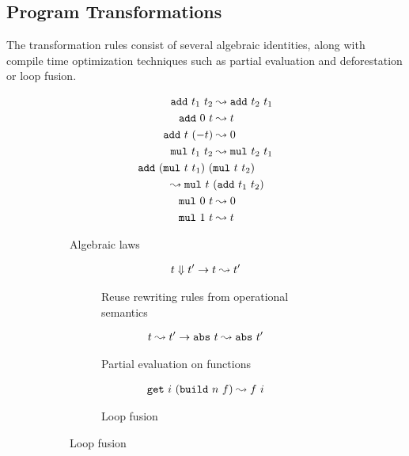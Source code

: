 \subsection{Program Transformations}
The transformation rules consist of several algebraic identities, along with compile time optimization techniques such as partial evaluation and deforestation or loop fusion.

\begin{figure}[]
  \centering
  \begin{subfigure}{0.48\textwidth}
    \centering
    \begin{align*}
      \texttt{add}\ t_1\ t_2 &\leadsto \texttt{add}\ t_2\ t_1 \\
      \texttt{add}\ 0\ t &\leadsto t \\
      \texttt{add}\ t\ (-t) &\leadsto 0 \\
      \texttt{mul}\ t_1\ t_2 &\leadsto \texttt{mul}\ t_2\ t_1 \\
      \texttt{add}\ (\texttt{mul}\ t\ t_1)\ (&\texttt{mul}\ t\ t_2) \\
        \leadsto \texttt{mul}\ t\ &(\texttt{add}\ t_1\ t_2) \\
      \texttt{mul}\ 0\ t &\leadsto 0 \\
      \texttt{mul}\ 1\ t &\leadsto t
    \end{align*}
    \caption{Algebraic laws}
  \end{subfigure}
  \begin{subfigure}{0.48\textwidth}
    \begin{subfigure}{1\textwidth}
      \begin{align*}
        t \Downarrow t' \to t \leadsto t'
      \end{align*}
      \caption{Reuse rewriting rules from operational semantics}
    \end{subfigure}
    \begin{subfigure}{1\textwidth}
      \begin{align*}
        t \leadsto t' \to \texttt{abs}\ t \leadsto \texttt{abs}\ t'
      \end{align*}
      \caption{Partial evaluation on functions}
    \end{subfigure}
    \begin{subfigure}{1\textwidth}
      \begin{align*}
        \texttt{get}\ i\ (\texttt{build}\ n\ f)\leadsto f\ i
      \end{align*}
      \caption{Loop fusion}
    \end{subfigure}
  \end{subfigure}
  \begin{subfigure}{1\textwidth}

\end{subfigure}
\end{figure}
